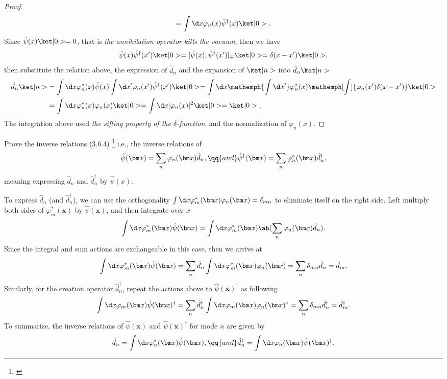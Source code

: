 \begin{solution}
\begin{proof}
\[  = \int \d x \varphi_n(x) \hat\psi^\dagger(x) \ket|0>.
  \]
  Since $\hat\psi(x) \ket|0> = 0$,
  that is \emph{the annihilation operator kills the vacuum},
  then we have
  \[
    \hat\psi(x) \hat\psi^\dagger(x') \ket|0>
  = [\hat\psi(x), \hat\psi^\dagger(x')]_\mp\ket|0>
  = \delta(x - x') \ket|0>,
  \]
  then substitute the relation above, the expression of $\hat d_n$
  and the expansion of $\ket|n>$ into $\hat d_n \ket|n>$
  \begin{align*}
    \hat d_n \ket|n> & =
    \int \d x \varphi_n^*(x) \hat\psi(x)
    \int \d x' \varphi_n(x') \hat\psi^\dagger(x') \ket|0>
  = \int \d x \mathemph{\int \d x'} \varphi_n^*(x)
              \mathemph[\int]{\varphi_n(x') \delta(x - x')} \ket|0>\\
& = \int \d x \varphi_n^*(x) \varphi_n(x) \ket|0>
  = \int \d x |\varphi_n(x)|^2 \ket|0> = \ket|0>.
  \end{align*}
  The integration above used \emph{the sifting property of the $\delta$-function},
  and the normalization of $\varphi_n(x)$.
\end{proof}
\end{solution}

\begin{problem}
  Prove the inverse relations (3.6.4)%
  \footnote{\citep[see][eq. (1.60)]{4_stefanucci2013nonequilibrium}}
  i.e., the inverse relations of
  \[
    \hat\psi(\bm x) = \sum_n \varphi_n(\bm x)\hat d_n, \qq{and}
    \hat\psi^\dagger(\bm x) = \sum_n \varphi_n^*(\bm x)\hat d_n^\dagger,
  \]
  meaning expressing $\hat d_n$ and $\hat d_n^\dagger$ by $\hat\psi(x)$.
\end{problem}
\begin{solution}
  To express $\hat d_n$ (and $\hat d_n^\dagger$),
  we can use the orthogonality
  $\int \d x \varphi_m^*(\bm x) \varphi_n(\bm x) = \delta_{mn}$
  to eliminate itself on the right side.
  Left multiply both sides of $\varphi_m^*(\bm x)$ by $\hat \psi(\bm x)$,
  and then integrate over $x$
  \[
    \int \d x \varphi_m^*(\bm x) \hat\psi(\bm x)
  = \int \d x \varphi_m^*(\bm x) \ab(\sum_n \varphi_n(\bm x)\hat d_n).
  \]
  Since the integral and sum actions are exchangeable in this case,
  then we arrive at
  \[
    \int \d x \varphi_m^*(\bm x) \hat\psi(\bm x)
  = \sum_n \hat d_n \int \d x \varphi_m^*(\bm x) \varphi_n(\bm x)
  = \sum_n \delta_{mn} \hat d_n = \hat d_m.
  \]
  Similarly, for the creation operator $\hat d_n^\dagger$,
  repeat the actions above to $\hat\psi(\bm x)^\dagger$ as following
  \[
    \int \d x \varphi_m(\bm x) \hat\psi(\bm x)^\dagger
  = \sum_n \hat d_n^\dagger \int \d x \varphi_m(\bm x) \varphi_n(\bm x)^*
  = \sum_n \delta_{mn} \hat d_n^\dagger = \hat d_m^\dagger.
  \]
  To summarize,
  the inverse relations of $\hat \psi(\bm x)$ and $\hat \psi(\bm x)^\dagger$
  for mode $n$ are given by
  \[
    \hat d_n = \int \d x \varphi_n^*(\bm x) \hat\psi(\bm x), \qq{and}
    \hat d_n^\dagger = \int \d x \varphi_n(\bm x) \hat\psi(\bm x)^\dagger.
  \]
\end{solution}

